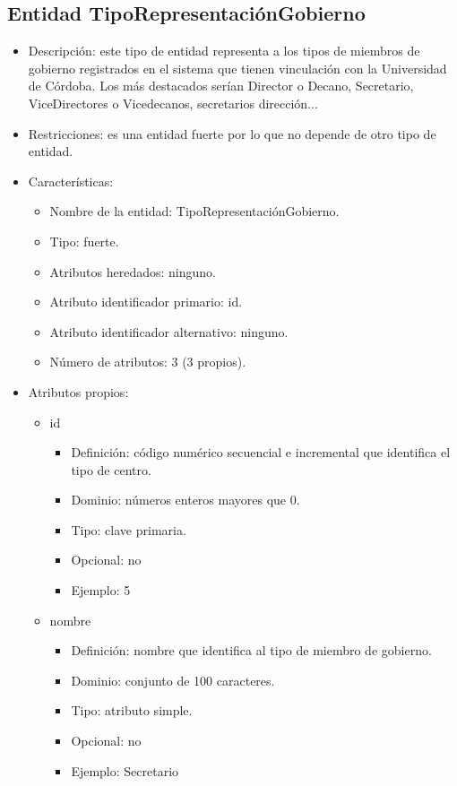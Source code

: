 \subsection{Entidad TipoRepresentaciónGobierno}
\begin{itemize}
    \item Descripción: este tipo de entidad representa a los tipos de miembros de gobierno registrados en el sistema que tienen vinculación con la Universidad de Córdoba. Los más destacados serían Director o Decano, Secretario, ViceDirectores o Vicedecanos, secretarios dirección...
    \item Restricciones: es una entidad fuerte por lo que no depende de otro tipo de entidad.
    \item Características:
    \begin{itemize}
        \item Nombre de la entidad: TipoRepresentaciónGobierno.
        \item Tipo: fuerte.
        \item Atributos heredados: ninguno.
        \item Atributo identificador primario: id.
        \item Atributo identificador alternativo: ninguno.
        \item Número de atributos: 3 (3 propios).
    \end{itemize}

    \item Atributos propios:
    \begin{itemize}
        \item id
        \begin{itemize}
            \item Definición: código numérico secuencial e incremental que identifica el tipo de centro.
            \item Dominio: números enteros mayores que 0.
            \item Tipo: clave primaria.
            \item Opcional: no
            \item Ejemplo: 5
        \end{itemize}

        \item nombre
        \begin{itemize}
            \item Definición: nombre que identifica al tipo de miembro de gobierno.
            \item Dominio: conjunto de 100 caracteres.
            \item Tipo: atributo simple.
            \item Opcional: no
            \item Ejemplo: Secretario
        \end{itemize}


\end{itemize}
\end{itemize}
